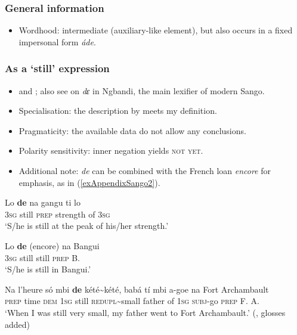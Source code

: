 \subsubsection{General information}
\begin{itemize}
	\item Wordhood: intermediate (auxiliary-like element), but also occurs in a fixed impersonal form \textit{áde}.
\end{itemize}


\subsubsection{As a  \lq still\rq{ }expression}
\begin{itemize}
	\item \textcite[53]{Tisserant1950} and \textcite{NassensteinPasch2021}; also see \textcite[104–105]{Lekens1955} on \textit{dɛ} in Ngbandi, the main lexifier of modern Sango.
	\item Specialisation: the description by \citeauthor{NassensteinPasch2021} meets my definition.
	\item Pragmaticity: the available data do not allow any conclusions.
	\item Polarity sensitivity: inner negation yields \textsc{not yet}.
	\item Additional note: \textit{de} can be combined with the French loan \textit{encore} for emphasis, as in (\ref{exAppendixSango2}).
\end{itemize}
\begin{exe}
	\ex 
	\gll Lo \textbf{de} na gangu ti lo\\
	3\textsc{sg} still \textsc{prep} strength of 3\textsc{sg}\\
	\glt \lq S/he is still at the peak of his/her strength.\rq{ }\parencite[114]{NassensteinPasch2021}
	
 \ex\label{exAppendixSango2}
	\gll Lo \textbf{de} (encore) na Bangui\\
    3\textsc{sg} still \phantom{(}still \textsc{prep} B.\\
	\glt \lq S/he is still in Bangui.' \parencite[114]{NassensteinPasch2021}
 
	\ex \gll Na l’heure só mbi \textbf{de} kété\sim{}kété, babá tí mbi a-goe na {Fort Archambault}\\
	\textsc{prep} time \textsc{dem} 1\textsc{sg} still \textsc{redupl}\sim{}small father of 1\textsc{sg} \textsc{subj}-go \textsc{prep} {F. A.}\\
	\glt \lq When I was still very small, my father went to Fort Archambault.' (\cite[238]{Samarin1963}, glosses added)
\end{exe}

